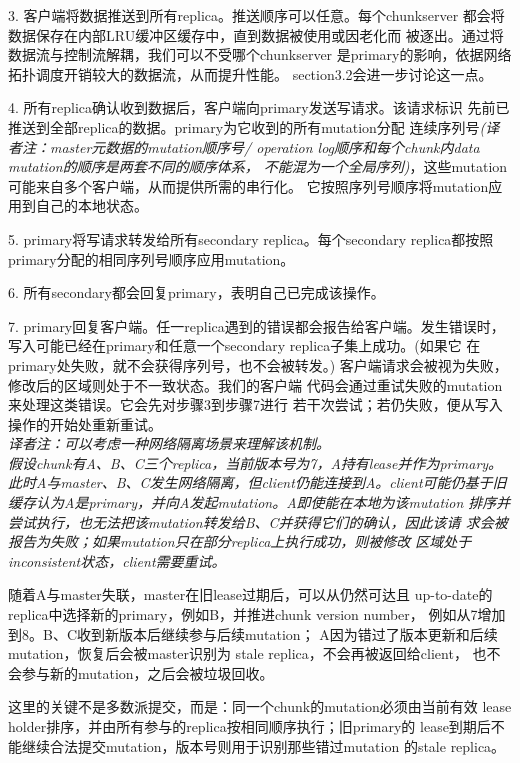 3. 客户端将数据推送到所有replica。推送顺序可以任意。每个chunkserver
   都会将数据保存在内部LRU缓冲区缓存中，直到数据被使用或因老化而
   被逐出。通过将数据流与控制流解耦，我们可以不受哪个chunkserver
   是primary的影响，依据网络拓扑调度开销较大的数据流，从而提升性能。
   section3.2会进一步讨论这一点。

4. 所有replica确认收到数据后，客户端向primary发送写请求。该请求标识
   先前已推送到全部replica的数据。primary为它收到的所有mutation分配
   连续序列号\emph{(译者注：master元数据的mutation顺序号/
   operation log顺序和每个chunk内data mutation的顺序是两套不同的顺序体系，
   不能混为一个全局序列)}，这些mutation可能来自多个客户端，从而提供所需的串行化。
   它按照序列号顺序将mutation应用到自己的本地状态。

5. primary将写请求转发给所有secondary replica。每个secondary replica都按照
   primary分配的相同序列号顺序应用mutation。

6. 所有secondary都会回复primary，表明自己已完成该操作。

7. primary回复客户端。任一replica遇到的错误都会报告给客户端。发生错误时，
   写入可能已经在primary和任意一个secondary replica子集上成功。(如果它
   在primary处失败，就不会获得序列号，也不会被转发。)
   客户端请求会被视为失败，修改后的区域则处于不一致状态。我们的客户端
   代码会通过重试失败的mutation来处理这类错误。它会先对步骤3到步骤7进行
   若干次尝试；若仍失败，便从写入操作的开始处重新重试。
   \\\begingroup\itshape 译者注：可以考虑一种网络隔离场景来理解该机制。
   \\假设chunk有A、B、C三个replica，当前版本号为7，A持有lease并作为primary。
   此时A与master、B、C发生网络隔离，但client仍能连接到A。client可能仍基于旧
   缓存认为A是primary，并向A发起mutation。A即使能在本地为该mutation
   排序并尝试执行，也无法把该mutation转发给B、C并获得它们的确认，因此该请
   求会被报告为失败；如果mutation只在部分replica上执行成功，则被修改
   区域处于inconsistent状态，client需要重试。

   随着A与master失联，master在旧lease过期后，可以从仍然可达且
   up-to-date的replica中选择新的primary，例如B，并推进chunk version number，
   例如从7增加到8。B、C收到新版本后继续参与后续mutation；
   A因为错过了版本更新和后续mutation，恢复后会被master识别为
   stale replica，不会再被返回给client，
   也不会参与新的mutation，之后会被垃圾回收。

   这里的关键不是多数派提交，而是：同一个chunk的mutation必须由当前有效
   lease holder排序，并由所有参与的replica按相同顺序执行；旧primary的
   lease到期后不能继续合法提交mutation，版本号则用于识别那些错过mutation
   的stale replica。
   
